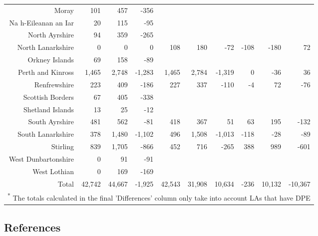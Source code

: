 \documentclass[
  12pt,
]{article}
\begin{document}
\begin{landscape}
\begin{table}[H]
\begin{tabular}[t]{rrrrrrrrrr}
Moray & 101 & 457 & -356 &  &  &  &  &  & \\
Na h-Eileanan an Iar & 20 & 115 & -95 &  &  &  &  &  & \\
North Ayrshire & 94 & 359 & -265 &  &  &  &  &  & \\
North Lanarkshire & 0 & 0 & 0 & 108 & 180 & -72 & -108 & -180 & 72\\
Orkney Islands & 69 & 158 & -89 &  &  &  &  &  & \\
Perth and Kinross & 1,465 & 2,748 & -1,283 & 1,465 & 2,784 & -1,319 & 0 & -36 & 36\\
Renfrewshire & 223 & 409 & -186 & 227 & 337 & -110 & -4 & 72 & -76\\
Scottish Borders & 67 & 405 & -338 &  &  &  &  &  & \\
Shetland Islands & 13 & 25 & -12 &  &  &  &  &  & \\
South Ayrshire & 481 & 562 & -81 & 418 & 367 & 51 & 63 & 195 & -132\\
South Lanarkshire & 378 & 1,480 & -1,102 & 496 & 1,508 & -1,013 & -118 & -28 & -89\\
Stirling & 839 & 1,705 & -866 & 452 & 716 & -265 & 388 & 989 & -601\\
West Dunbartonshire & 0 & 91 & -91 &  &  &  &  &  & \\
West Lothian & 0 & 169 & -169 &  &  &  &  &  & \\
\midrule
Total & 42,742 & 44,667 & -1,925 & 42,543 & 31,908 & 10,634 & -236 & 10,132 & -10,367\\
\bottomrule
\multicolumn{10}{l}{\rule{0pt}{1em}\textsuperscript{*} The totals calculated in the final 'Differences' column only take into account LAs that have DPE}\\
\end{tabular}
\end{table}
\end{landscape}

\hypertarget{references}{%
\subsection*{References}\label{references}}
\end{document}
